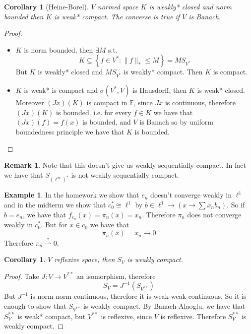 \documentclass[11pt,a4paper]{article}
\theoremstyle{definition}
\newtheorem{example}[definition]{Example}
\newtheorem{remark}[definition]{Remark}
\theoremstyle{plain}
\newtheorem{corollary}[definition]{Corollary}
\theoremstyle{remark}
\newcommand{\F}{\mathbb{F}}
\renewcommand{\set}[1]{\left\{ #1 \right\}}
\newcommand{\norm}[1]{\lVert #1 \rVert}
\newcommand{\1}{\mathbbm{1}}
\newcommand{\wto}{\rightharpoonup}
\begin{document}
\begin{corollary}[Heine-Borel]
    $V$ normed space $K$ is weakly* closed and norm bounded then $K$ is weak* compact. 
    The converse is true if $V$ is Banach. 
\end{corollary}

\begin{proof}
    \begin{itemize}
        \item[$\implies$] $K$ is norm bounded, then $\exists M$ s.t. 
        $$K \subseteq \set{f \in V^* \colon \norm{f}_* \le M} = M S_{V^*}$$
        But $K$ is weakly* closed and $MS_{V^*}$ is weakly* compact. Then $K$ is compact. 

        \item[$\impliedby$] $K$ is weak* is compact and $\sigma(V^*, V)$ is Hausdorff, then $K$ is weak* closed. Moreover 
        $(Jx) (K)$ is compact in $\F$, since $Jx$ is continuous, therefore $(Jx)(K)$ is bounded. i.e. for every $f \in K$ we have that $(Jx)(f) = f(x)$ is bounded, 
        and $V$ is Banach so by uniform boundedness principle we have that $K$ is bounded. 
    \end{itemize} 
\end{proof}

\begin{remark}
    Note that this doesn't give us weakly sequentially compact. In fact we have that $S_{(\ell^\infty)^*}$ is not weakly sequentially compact.
\end{remark}

\begin{example}
    In the homework we show that $e_n$ doesn't converge weakly in $\ell^1$ and in the midterm we show that $c_0^* \cong \ell^1$ by $b \in \ell^1 \to (x \to \sum x_n b_n)$. So if $b = e_n$, 
    we have that $f_{e_n} (x) = \pi_n(x) = x_n$. Therefore $\pi_n$ does not converge weakly in $c_0^*$.  But for $x \in c_0$ we have that 
    $$\pi_n(x) = x_n \to 0$$
    Therefore $\pi_n \overset{*}{\wto} 0$. 
\end{example}

\begin{corollary}
    $V$ reflexive space, then $S_V$ is weakly compact. 
\end{corollary}

\begin{proof}
    Take $J \colon V \to V^{**}$ an isomorphism, therefore 
    $$S_V = J^{-1}(S_{V^{**}})$$
    But $J^{-1}$ is norm-norm continuous, therefore it is weak-weak continuous. So it is enough to show that $S_{V^{**}}$ is weakly compact. By Banach Alaoglu, we have that 
    $S_V^{**}$ is weak* compact, but $V^{**}$ is reflexive, since $V$ is reflexive. Therefore $S_V^{**}$ is weakly compact. 
\end{proof}
\end{document}
